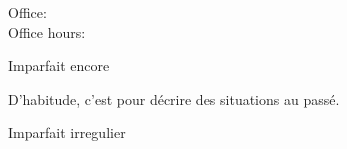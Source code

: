 \documentclass{beamer}
\subtitle[Habitudes et imparfait]{Les habitudes et l'imparfait}
\begin{document}
  \begin{frame}
    \titlepage
    \tiny{Office: \\
          Office hours: }
  \end{frame}

  \begin{frame}{Imparfait encore}
    \begin{center}
      
    \end{center}
    D'habitude, c'est pour décrire des situations au passé.
  \end{frame}

  \begin{frame}{Imparfait irregulier}
    \begin{center}
      
    \end{center}
  \end{frame}
\end{document}
